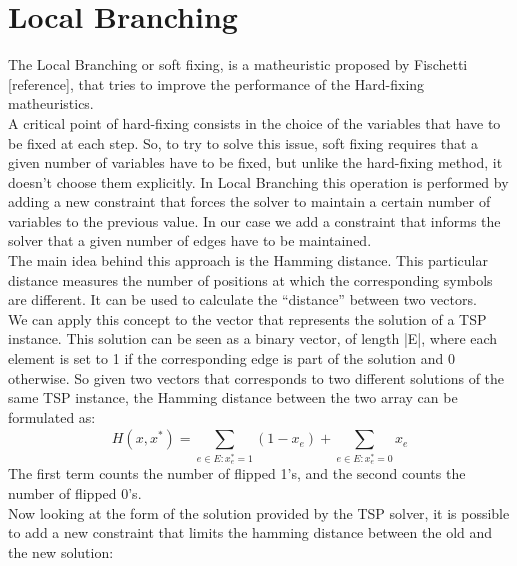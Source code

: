 \section{Local Branching}

The Local Branching or soft fixing, is a matheuristic proposed by Fischetti [reference], that tries to improve the performance of the Hard-fixing matheuristics.\\
A critical point of hard-fixing consists in the choice of the variables that have to be fixed at each step. So, to try to solve this issue, soft fixing requires that a given number of variables have to be fixed, but unlike the hard-fixing method, it doesn’t choose them explicitly. In Local Branching this operation is performed by adding a new constraint that forces the solver to maintain a certain number of variables to the previous value. In our case we add a constraint that informs the solver that a given number of edges have to be maintained. \\
The main idea behind this approach is the Hamming distance. This particular distance measures the number of positions at which the corresponding symbols are different. It can be used to calculate the “distance” between two vectors. \\
We can apply this concept to the vector that represents the solution of a TSP instance. This solution can be seen as a binary vector, of length |E|, where each element is set to 1 if the corresponding edge is part of the solution and 0 otherwise. So given two vectors that corresponds to two different solutions of the same TSP instance, the Hamming distance between the two array can be formulated as:
\begin{equation}
   H(x,x^*)= \sum_{e\in E: x_e^*=1}^{}(1-x_e) + \sum_{e\in E: x_e^*=0}^{}x_e
\end{equation}
The first term counts the number of flipped 1’s, and the second counts the number of flipped 0’s. \\
Now looking at the form of the solution provided by the TSP solver, it is possible to add a new constraint that limits the hamming distance between the old and the new solution:


